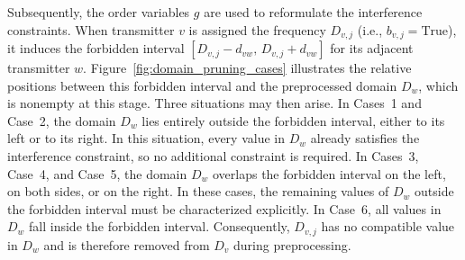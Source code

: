 Subsequently, the order variables $g$ are used to reformulate the interference constraints. When transmitter $v$ is assigned the frequency $D_{v,j}$ (i.e., $b_{v,j}=\text{True}$), it induces the forbidden interval $[D_{v,j}-d_{vw},\,D_{v,j}+d_{vw}]$ for its adjacent transmitter $w$. Figure~\ref{fig:domain_pruning_cases} illustrates the relative positions between this forbidden interval and the preprocessed domain $D_w$, which is nonempty at this stage. Three situations may then arise. In Cases~1 and Case~2, the domain $D_w$ lies entirely outside the forbidden interval, either to its left or to its right. In this situation, every value in $D_w$ already satisfies the interference constraint, so no additional constraint is required. In Cases~3, Case~4, and Case~5, the domain $D_w$ overlaps the forbidden interval on the left, on both sides, or on the right. In these cases, the remaining values of $D_w$ outside the forbidden interval must be characterized explicitly. In Case~6, all values in $D_w$ fall inside the forbidden interval. Consequently, $D_{v,j}$ has no compatible value in $D_w$ and is therefore removed from $D_v$ during preprocessing.
